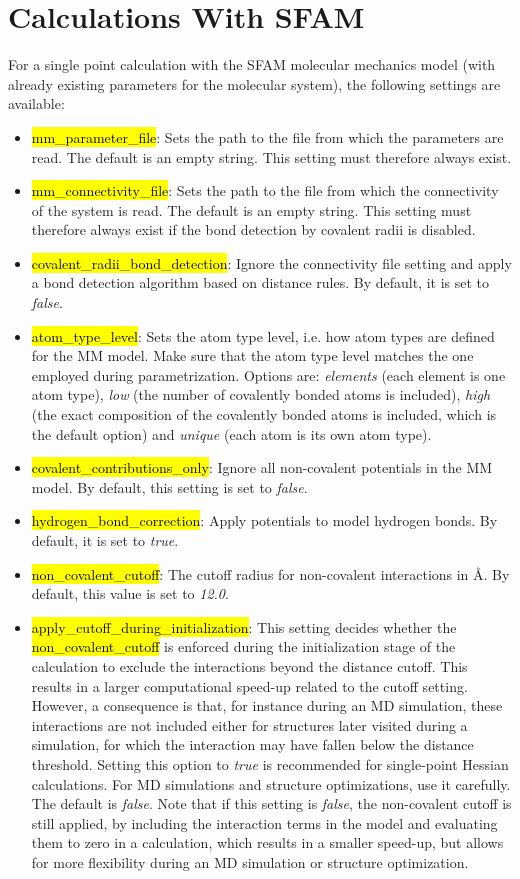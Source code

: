 \documentclass[]{tufte-book}
\begin{document}
{{\chapter{Calculations With SFAM}
\label{sec:sfam_calc}

For a single point calculation with the SFAM molecular mechanics model (with already existing parameters for the molecular system), the following settings are available:

\begin{itemize}
\item \hl{mm\_parameter\_file}: Sets the path to the file from which the parameters are read. The default is an empty string. This setting must therefore always exist.
\item \hl{mm\_connectivity\_file}: Sets the path to the file from which the connectivity of the system is read. The default is an empty string. This setting must therefore always exist if the bond detection by covalent radii is disabled.
\item \hl{covalent\_radii\_bond\_detection}: Ignore the connectivity file setting and apply a bond detection algorithm based on distance rules. By default, it is set to \textit{false}.
\item \hl{atom\_type\_level}: Sets the atom type level, i.e. how atom types are defined for the MM model. Make sure that the atom type level matches the one employed during parametrization. Options are: \textit{elements} (each element is one atom type), \textit{low} (the number of covalently bonded atoms is included), \textit{high} (the exact composition of the covalently bonded atoms is included, which is the default option) and \textit{unique} (each atom is its own atom type).
\item \hl{covalent\_contributions\_only}: Ignore all non-covalent potentials in the MM model. By default, this setting is set to \textit{false}.
\item \hl{hydrogen\_bond\_correction}: Apply potentials to model hydrogen bonds. By default, it is set to \textit{true}.
\item \hl{non\_covalent\_cutoff}: The cutoff radius for non-covalent interactions in \AA. By default, this value is set to \textit{12.0}.
\item \hl{apply\_cutoff\_during\_initialization}: This setting decides whether the \hl{non\_covalent\_cutoff} is enforced during the initialization stage of the calculation to exclude the interactions beyond the distance cutoff. This results in a larger computational speed-up related to the cutoff setting. However, a consequence is that, for instance during an MD simulation, these interactions are not included either for structures later visited during a simulation, for which the interaction may have fallen below the distance threshold. Setting this option to \textit{true} is recommended for single-point Hessian calculations. For MD simulations and structure optimizations, use it carefully. The default is \textit{false}. Note that if this setting is \textit{false}, the non-covalent cutoff is still applied, by including the interaction terms in the model and evaluating them to zero in a calculation, which results in a smaller speed-up, but allows for more flexibility during an MD simulation or structure optimization.

\end{itemize}}}
\end{document}
